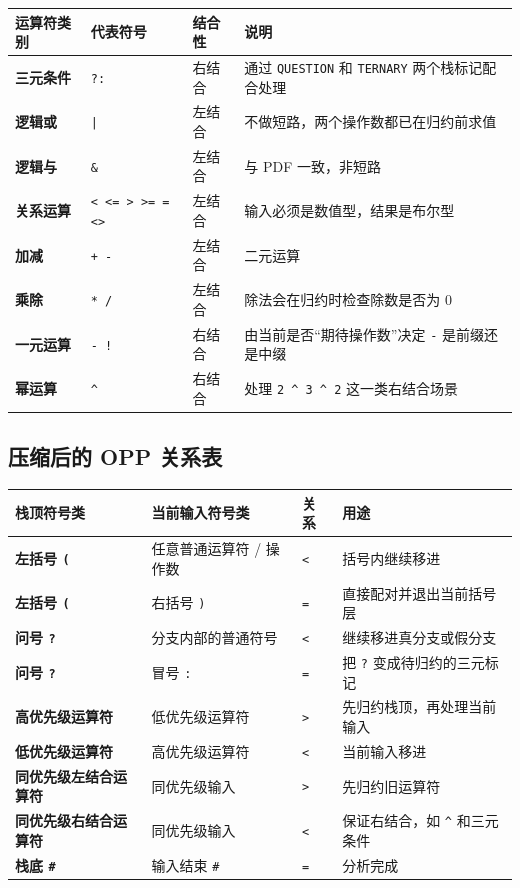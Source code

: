 \documentclass[12pt,a4paper,fontset=none]{ctexart}
\begin{document}
\begin{table}[H]
  \centering
  \begin{tabularx}{\textwidth}{>{\bfseries}P{2.8cm}P{3.1cm}P{2.4cm}Y}
    \toprule
    运算符类别 & 代表符号 & 结合性 & 说明 \\
    \midrule
    三元条件 & \texttt{?:} & 右结合 & 通过 \texttt{QUESTION} 和 \texttt{TERNARY} 两个栈标记配合处理 \\
    逻辑或 & \texttt{|} & 左结合 & 不做短路，两个操作数都已在归约前求值 \\
    逻辑与 & \texttt{\&} & 左结合 & 与 PDF 一致，非短路 \\
    关系运算 & \texttt{< <= > >= = <>} & 左结合 & 输入必须是数值型，结果是布尔型 \\
    加减 & \texttt{+ -} & 左结合 & 二元运算 \\
    乘除 & \texttt{* /} & 左结合 & 除法会在归约时检查除数是否为 0 \\
    一元运算 & \texttt{- !} & 右结合 & 由当前是否“期待操作数”决定 \texttt{-} 是前缀还是中缀 \\
    幂运算 & \texttt{\^{}} & 右结合 & 处理 \texttt{2 \^{} 3 \^{} 2} 这一类右结合场景 \\
    \bottomrule
  \end{tabularx}
\end{table}

\subsection{压缩后的 OPP 关系表}

\begin{table}[H]
  \centering
  \begin{tabularx}{\textwidth}{>{\bfseries}P{2.6cm}P{2.6cm}P{1.2cm}Y}
    \toprule
    栈顶符号类 & 当前输入符号类 & 关系 & 用途 \\
    \midrule
    左括号 \texttt{(} & 任意普通运算符 / 操作数 & \texttt{<} & 括号内继续移进 \\
    左括号 \texttt{(} & 右括号 \texttt{)} & \texttt{=} & 直接配对并退出当前括号层 \\
    问号 \texttt{?} & 分支内部的普通符号 & \texttt{<} & 继续移进真分支或假分支 \\
    问号 \texttt{?} & 冒号 \texttt{:} & \texttt{=} & 把 \texttt{?} 变成待归约的三元标记 \\
    高优先级运算符 & 低优先级运算符 & \texttt{>} & 先归约栈顶，再处理当前输入 \\
    低优先级运算符 & 高优先级运算符 & \texttt{<} & 当前输入移进 \\
    同优先级左结合运算符 & 同优先级输入 & \texttt{>} & 先归约旧运算符 \\
    同优先级右结合运算符 & 同优先级输入 & \texttt{<} & 保证右结合，如 \texttt{\^{}} 和三元条件 \\
    栈底 \texttt{\#} & 输入结束 \texttt{\#} & \texttt{=} & 分析完成 \\
    \bottomrule
  \end{tabularx}
\end{table}
\end{document}
